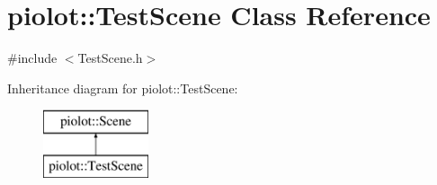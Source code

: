 \hypertarget{classpiolot_1_1_test_scene}{}\section{piolot\+:\+:Test\+Scene Class Reference}
\label{classpiolot_1_1_test_scene}


{\ttfamily \#include $<$Test\+Scene.\+h$>$}

Inheritance diagram for piolot\+:\+:Test\+Scene\+:\begin{figure}[H]
\begin{center}
\leavevmode
\includegraphics[height=2.000000cm]{classpiolot_1_1_test_scene}
\end{center}
\end{figure}
